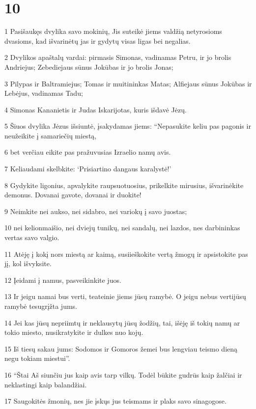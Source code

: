 \chapter{10}


\par 1 Pasišaukęs dvylika savo mokinių, Jis suteikė jiems valdžią netyrosioms dvasioms, kad išvarinėtų jas ir gydytų visas ligas bei negalias. 
\par 2 Dvylikos apaštalų vardai: pirmasis Simonas, vadinamas Petru, ir jo brolis Andriejus; Zebediejaus sūnus Jokūbas ir jo brolis Jonas; 
\par 3 Pilypas ir Baltramiejus; Tomas ir muitininkas Matas; Alfiejaus sūnus Jokūbas ir Lebėjus, vadinamas Tadu; 
\par 4 Simonas Kananietis ir Judas Iskarijotas, kuris išdavė Jėzų. 
\par 5 Šiuos dvylika Jėzus išsiuntė, įsakydamas jiems: “Nepasukite keliu pas pagonis ir neužeikite į samariečių miestą, 
\par 6 bet verčiau eikite pas pražuvusias Izraelio namų avis. 
\par 7 Keliaudami skelbkite: ‘Prisiartino dangaus karalystė!’ 
\par 8 Gydykite ligonius, apvalykite raupsuotuosius, prikelkite mirusius, išvarinėkite demonus. Dovanai gavote, dovanai ir duokite! 
\par 9 Neimkite nei aukso, nei sidabro, nei variokų į savo juostas; 
\par 10 nei kelionmaišio, nei dviejų tunikų, nei sandalų, nei lazdos, nes darbininkas vertas savo valgio. 
\par 11 Atėję į kokį nors miestą ar kaimą, susiieškokite vertą žmogų ir apsistokite pas jį, kol išvyksite. 
\par 12 Įeidami į namus, pasveikinkite juos. 
\par 13 Ir jeigu namai bus verti, teateinie jiems jūsų ramybė. O jeigu nebus verti­jūsų ramybė tesugrįžta jums. 
\par 14 Jei kas jūsų nepriimtų ir neklausytų jūsų žodžių, tai, išėję iš tokių namų ar tokio miesto, nusikratykite ir dulkes nuo kojų. 
\par 15 Iš tiesų sakau jums: Sodomos ir Gomoros žemei bus lengviau teismo dieną negu tokiam miestui”. 
\par 16 “Štai Aš siunčiu jus kaip avis tarp vilkų. Todėl būkite gudrūs kaip žalčiai ir neklastingi kaip balandžiai. 
\par 17 Saugokitės žmonių, nes jie įskųs jus teismams ir plaks savo sinagogose. 
